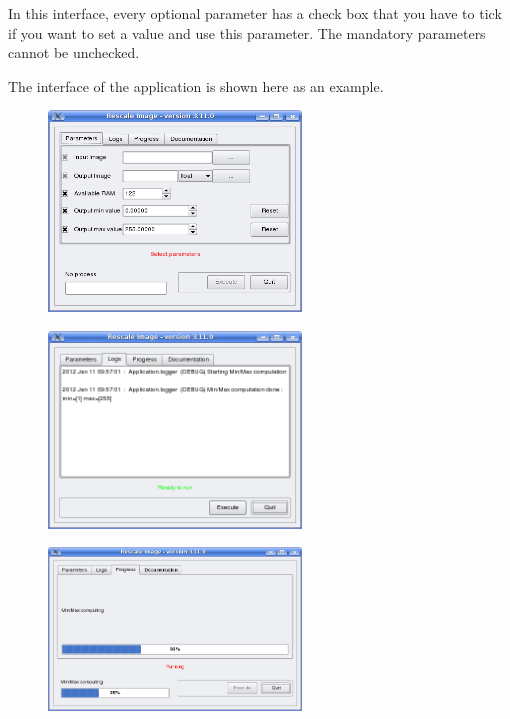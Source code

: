 In this interface, every optional parameter has a check box that
you have to tick if you want to set a value and use this parameter.
The mandatory parameters cannot be unchecked.
 
The interface of the application  is shown 
here as an example.

\begin{figure}[h]
  \center
  \includegraphics[width=0.6\textwidth]{../Art/QtImages/rescale_param.png}
  \label{fig:rescaleParam}
\end{figure}

\begin{figure}[h]
  \center
  \includegraphics[width=0.6\textwidth]{../Art/QtImages/rescale_logs.png}
  \label{fig:rescaleLogs}
\end{figure}

\begin{figure}[h]
  \center
  \includegraphics[width=0.6\textwidth]{../Art/QtImages/rescale_progress.png}
  \label{fig:rescaleProgress}
\end{figure}

